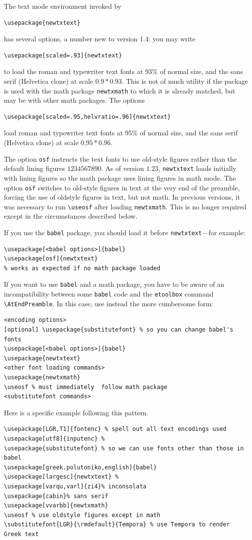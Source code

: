 \documentclass[11pt]{article}
\theoremstyle{oldplain}
\theoremstyle{plain}
\begin{document}
The text mode environment invoked by
\begin{verbatim}
\usepackage{newtxtext}
\end{verbatim}
has several options, a number new to version 1.4: you may write
\begin{verbatim}
\usepackage[scaled=.93]{newtxtext}
\end{verbatim}
to load the roman and typewriter text fonts at 93\% of normal size, and the sans serif (\textsf{Helvetica} clone) at scale $0.9*0.93$. This is not of much utility if the package is used with the math package {\tt newtxmath} to which it is already matched, but may be with other math packages. The options
\begin{verbatim}
\usepackage[scaled=.95,helvratio=.96]{newtxtext}
\end{verbatim}
load roman and typewriter text fonts at 95\% of normal size, and the sans serif (\textsf{Helvetica} clone) at scale $0.95*0.96$.

The option \texttt{osf} instructs the text fonts to use old-style figures  rather than the default lining figures $1234567890$. As of version $1.23$, {\tt newtxtext} loads initially with lining figures so the math package uses lining figures in math mode. The option {\tt osf} switches to old-style figures in text at the very end of the preamble, forcing the use of oldstyle figures in text, but not math. In previous versions, it was necessary to run 
\verb|\useosf| after loading {\tt newtxmath}. This is no longer required except in the circumstances described below.

If you use the {\tt babel} package, you should load it before {\tt newtxtext}---for example:
\begin{verbatim}
\usepackage[<babel options>]{babel}
\usepackage[osf]{newtxtext}
% works as expected if no math package loaded
\end{verbatim}
If you want to use {\tt babel} and a math package, you have to be aware of an incompatibility between some {\tt babel} code and the {\tt etoolbox} command \verb|\AtEndPreamble|. In this case, use instead the more cumbersome form:
\begin{verbatim}
<encoding options>
[optional] \usepackage{substitutefont} % so you can change babel's fonts
\usepackage[<babel options>]{babel}
\usepackage{newtxtext}
<other font loading commands>
\usepackage{newtxmath}
\useosf % must immediately  follow math package
<substitutefont commands>
\end{verbatim}
Here is a specific example following this pattern.
\begin{verbatim}
\usepackage[LGR,T1]{fontenc} % spell out all text encodings used
\usepackage[utf8]{inputenc} % 
\usepackage{substitutefont} % so we can use fonts other than those in babel
\usepackage[greek.polutoniko,english]{babel}
\usepackage[largesc]{newtxtext} % 
\usepackage[varqu,varl]{zi4}% inconsolata
\usepackage{cabin}% sans serif
\usepackage[vvarbb]{newtxmath}
\useosf % use oldstyle figures except in math
\substitutefont{LGR}{\rmdefault}{Tempora} % use Tempora to render Greek text
\end{verbatim}
\end{document}
